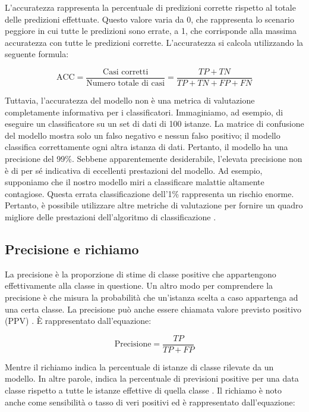 L'accuratezza rappresenta la percentuale di predizioni corrette 
rispetto al totale delle predizioni effettuate. Questo valore 
varia da 0, che rappresenta lo scenario peggiore in cui tutte le predizioni sono errate, 
a 1, che corrisponde alla massima accuratezza con tutte le predizioni corrette.
L'accuratezza si calcola utilizzando la seguente formula:

\begin{equation}
    \text{ACC} = \frac{\text{Casi corretti}}{\text{Numero totale di casi}}=\frac{TP + TN}{TP+TN+FP+FN}
\end{equation}

Tuttavia, l'accuratezza del modello non è una metrica di valutazione completamente 
informativa per i classificatori. Immaginiamo, ad esempio, di eseguire un 
classificatore su un set di dati di 100 istanze. La matrice di confusione 
del modello mostra solo un falso negativo e nessun falso positivo; 
il modello classifica correttamente ogni altra istanza di dati. 
Pertanto, il modello ha una precisione del 99\%. 
Sebbene apparentemente desiderabile, l'elevata precisione non è di per sé 
indicativa di eccellenti prestazioni del modello. 
Ad esempio, supponiamo che il nostro modello miri a classificare malattie 
altamente contagiose. Questa errata classificazione dell'1\% rappresenta un 
rischio enorme. Pertanto, è possibile utilizzare altre metriche di valutazione 
per fornire un quadro migliore delle prestazioni dell'algoritmo di classificazione
\cite{Confusion_Matrix_e_metrics1,Confusion_Matrix_e_metrics2}.

\subsection{Precisione e richiamo}
La precisione è la proporzione di stime di classe positive che 
appartengono effettivamente alla classe in questione. 
Un altro modo per comprendere la precisione è che misura la probabilità 
che un'istanza scelta a caso appartenga ad una certa classe. La precisione può 
anche essere chiamata valore previsto positivo (PPV) 
\cite{Confusion_Matrix_e_metrics1,Confusion_Matrix_e_metrics2} . 
È rappresentato dall'equazione:

\begin{equation}
    \text{Precisione} = \frac{TP}{TP + FP}
\end{equation}

Mentre il richiamo indica la percentuale di istanze di classe rilevate da un modello.
In altre parole, indica la percentuale di previsioni positive per una data 
classe rispetto a tutte le istanze effettive di quella classe
\cite{Confusion_Matrix_e_metrics1,Confusion_Matrix_e_metrics2}. 
Il richiamo è noto anche come sensibilità o tasso di veri positivi ed è 
rappresentato dall'equazione:

